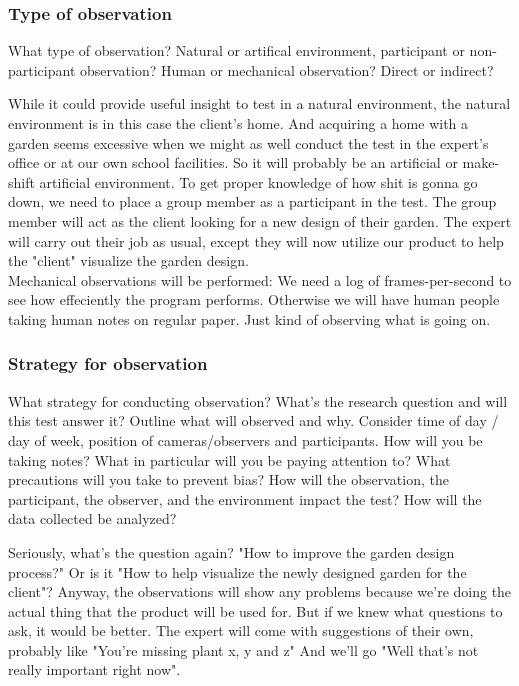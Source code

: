 \subsubsection{Type of observation}
What type of observation? Natural or artifical environment, participant or non-participant observation?
Human or mechanical observation? Direct or indirect?

While it could provide useful insight to test in a natural environment, the natural environment is in this case the client's home. And acquiring a home with a garden seems excessive when we might as well conduct the test in the expert's office or at our own school facilities. So it will probably be an artificial or make-shift artificial environment. To get proper knowledge of how shit is gonna go down, we need to place a group member as a participant in the test. The group member will act as the client looking for a new design of their garden. The expert will carry out their job as usual, except they will now utilize our product to help the "client" visualize the garden design.\\
Mechanical observations will be performed: We need a log of frames-per-second to see how effeciently the program performs. Otherwise we will have human people taking human notes on regular paper. Just kind of observing what is going on.

\subsubsection{Strategy for observation}
What strategy for conducting observation? What's the research question and will this test answer it? Outline what will observed and why. Consider time of day / day of week, position of cameras/observers and participants. How will you be taking notes? What in particular will you be paying attention to? What precautions will you take to prevent bias? How will the observation, the participant, the observer, and the environment impact the test? 
How will the data collected be analyzed?

Seriously, what's the question again? "How to improve the garden design process?" Or is it "How to help visualize the newly designed garden for the client"? Anyway, the observations will show any problems because we're doing the actual thing that the product will be used for. But if we knew what questions to ask, it would be better. The expert will come with suggestions of their own, probably like "You're missing plant x, y and z" And we'll go "Well that's not really important right now". 

